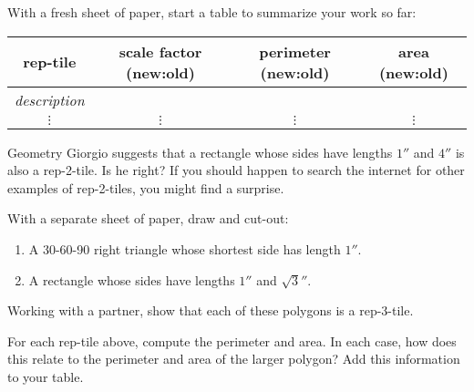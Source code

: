 \begin{prob}
With a fresh sheet of paper, start a table to summarize your work so far:  
\begin{center}
\begin{tabular}{c|c|c|c}
rep-tile & scale factor (new:old) &  perimeter (new:old) &  area (new:old)  \\ \hline\hline
\textit{description} &     &      &     \\ 
  $\vdots$    & $\vdots$  &  $\vdots$  &  $\vdots$ \\ 
\end{tabular}
\end{center}
\end{prob}


\begin{prob}
Geometry Giorgio suggests that a rectangle whose sides have lengths
$1''$ and $4''$ is also a rep-2-tile. Is he right? If you should
happen to search the internet for other examples of rep-2-tiles, you
might find a surprise.
\end{prob}


\begin{prob}
With a separate sheet of paper, draw and cut-out:
\begin{enumerate}
\item A 30-60-90 right triangle whose shortest side has length $1''$.
\item A rectangle whose sides have lengths $1''$ and $\sqrt{3}''$.
\end{enumerate}
Working with a partner, show that each of these polygons is a rep-3-tile.
\end{prob}

\begin{prob}
For each rep-tile above, compute the perimeter and area. In each case,
how does this relate to the perimeter and area of the larger polygon?
Add this information to your table.
\end{prob}

